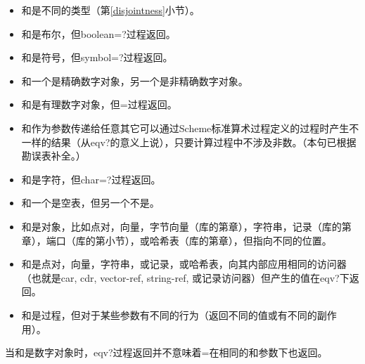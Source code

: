 \begin{entry}{%
}
\begin{itemize}
\item {}和是不同的类型（第\ref{disjointness}小节）。

\item {}和是布尔，但{\cf boolean=?}过程返回\schfalse{}。

\item {}和是符号，但{\cf symbol=?}过程返回\schfalse{}。

\item {}和一个是精确数字对象，另一个是非精确数字对象。

\item {}和是有理数字对象，但{\cf =}过程返回\schfalse{}。

\item {}和作为参数传递给任意其它可以通过Scheme标准算术过程定义的过程时产生不一样的结果（从{\cf eqv?}的意义上说），只要计算过程中不涉及非数。（本句已根据勘误表补全。）

\item {}和是字符，但{\cf char=?}过程返回\schfalse{}。

\item {}和一个是空表，但另一个不是。%

\item {}和是对象，比如点对，向量，字节向量（库的第章），字符串，记录（库的第章），端口（库的第小节），或哈希表（库的第章），但指向不同的位置。

\item {}和是点对，向量，字符串，或记录，或哈希表，向其内部应用相同的访问器（也就是{\cf car}, {\cf cdr}, {\cf vector-ref}, {\cf string-ref}, 或记录访问器）但产生的值在{\cf eqv?}下返回\schfalse{}。

\item {}和是过程，但对于某些参数有不同的行为（返回不同的值或有不同的副作用）。

\end{itemize}

\begin{note}
  当和是数字对象时，{\cf eqv?}过程返回\schtrue{}并不意味着{\cf =}在相同的和参数下也返回\schtrue{}。
\end{note}



\end{entry}
